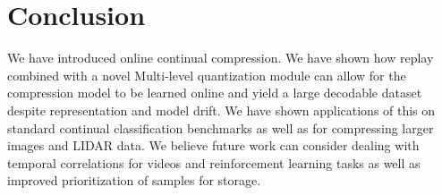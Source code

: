 \documentclass[colorinlistoftodos]{article} %
\begin{document}





\section{Conclusion}
We have introduced online continual compression. We have shown how replay combined with a novel Multi-level quantization module can allow for the compression model to be learned online and yield a large decodable dataset despite representation and model drift. We have shown applications of this on standard continual classification benchmarks as well as for compressing larger images and LIDAR data. We believe future work can consider dealing with temporal correlations for videos and reinforcement learning tasks as well as improved prioritization of samples for storage.  
\end{document}
